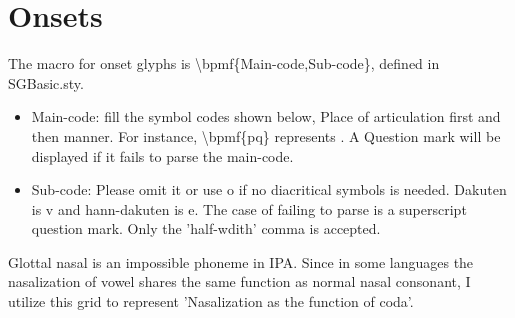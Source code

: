 \section{Onsets}
The macro for onset glyphs is {\textbackslash}bpmf\{Main-code,Sub-code\}, defined in SGBasic.sty. \par
\begin{itemize}
	\item Main-code: fill the symbol codes shown below, Place of articulation first and then manner. For instance, {\textbackslash}bpmf\{pq\} represents . A Question mark will be displayed if it fails to parse the main-code. 
	\item Sub-code: Please omit it or use o if no diacritical symbols is needed. Dakuten is v and hann-dakuten is e. The case of failing to parse is a superscript question mark. Only the 'half-wdith' comma is accepted. 
\end{itemize}
Glottal nasal is an impossible phoneme in IPA. Since in some languages the nasalization of vowel shares the same function as normal nasal consonant, I utilize this grid to represent 'Nasalization as the function of coda'. \par
{}
